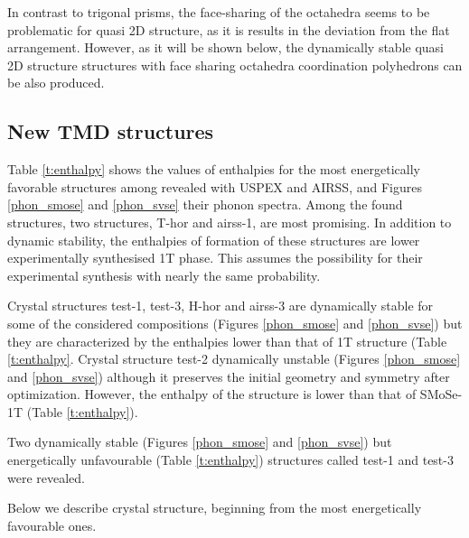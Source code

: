 \documentclass[a4paperm]{article}
\begin{document}
In contrast to trigonal prisms, the face-sharing of the octahedra seems to be problematic for quasi 2D structure, as it is results in the deviation from the flat arrangement.
However, as it will be shown below, the dynamically stable quasi 2D structure structures with face sharing octahedra coordination polyhedrons can be also produced.



		\subsection{New TMD structures}

Table \ref{t:enthalpy} shows the values of enthalpies for the most energetically favorable structures among revealed with USPEX and AIRSS, and Figures \ref{phon_smose} and  \ref{phon_svse} their phonon spectra. 
Among the found structures, two structures, T-hor and airss-1, are most promising.
In addition to dynamic stability, the enthalpies of formation of these structures are lower experimentally synthesised 1T phase.
This assumes the possibility for their experimental synthesis with nearly the same probability.

Crystal structures test-1, test-3, H-hor and airss-3 are dynamically stable for some of the considered compositions (Figures \ref{phon_smose} and  \ref{phon_svse}) but they are characterized by the enthalpies lower than that of 1T structure (Table \ref{t:enthalpy}. 
Crystal structure test-2 dynamically unstable (Figures \ref{phon_smose} and \ref{phon_svse}) although it preserves the initial geometry and symmetry after optimization.
However, the enthalpy of the structure is lower than that of SMoSe-1T  (Table \ref{t:enthalpy}).


Two dynamically stable (Figures \ref{phon_smose} and  \ref{phon_svse}) but energetically unfavourable (Table \ref{t:enthalpy}) structures called test-1 and test-3 were revealed.

Below we describe crystal structure, beginning from the most energetically favourable ones.



\end{document}
